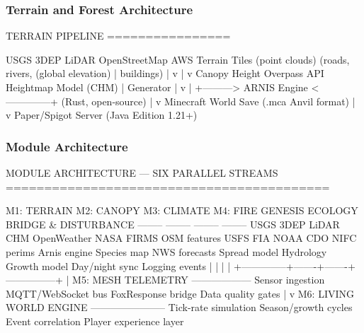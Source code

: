 \documentclass[11pt,letterpaper]{article}
\begin{document}
\subsubsection{Terrain and Forest Architecture}

\begin{asciibox}
TERRAIN PIPELINE
================

  USGS 3DEP LiDAR     OpenStreetMap        AWS Terrain Tiles
  (point clouds)       (roads, rivers,      (global elevation)
       |               buildings)                |
       v                    |                    v
  Canopy Height         Overpass API         Heightmap
  Model (CHM)              |               Generator
       |                   v                    |
       +---------> ARNIS Engine <--------------+
                   (Rust, open-source)
                        |
                        v
              Minecraft World Save
              (.mca Anvil format)
                        |
                        v
              Paper/Spigot Server
              (Java Edition 1.21+)
\end{asciibox}

\subsubsection{Module Architecture}

\begin{asciibox}
MODULE ARCHITECTURE — SIX PARALLEL STREAMS
==========================================

 M1: TERRAIN     M2: CANOPY      M3: CLIMATE     M4: FIRE
 GENESIS         ECOLOGY         BRIDGE          & DISTURBANCE
 --------        --------        --------        --------
 USGS 3DEP       LiDAR CHM       OpenWeather     NASA FIRMS
 OSM features    USFS FIA         NOAA CDO        NIFC perims
 Arnis engine    Species map     NWS forecasts   Spread model
 Hydrology       Growth model    Day/night sync  Logging events
      |              |               |               |
      +--------------+-------+-------+---------------+
                             |
                    M5: MESH TELEMETRY
                    ------------------
                    Sensor ingestion
                    MQTT/WebSocket bus
                    FoxResponse bridge
                    Data quality gates
                             |
                             v
                    M6: LIVING WORLD ENGINE
                    -----------------------
                    Tick-rate simulation
                    Season/growth cycles
                    Event correlation
                    Player experience layer
\end{asciibox}
\end{document}
